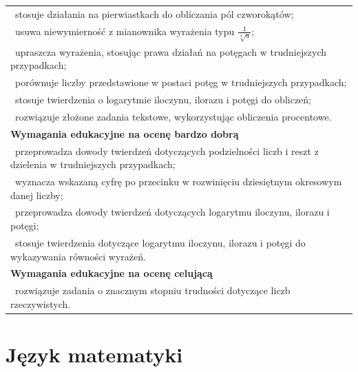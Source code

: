 \documentclass[12pt,a4paper]{article}
\begin{document}
\begin{longtable}{|p{16cm}|}
		\textbullet\ stosuje działania na pierwiastkach do obliczania pól czworokątów; \\
		
		\textbullet\ usuwa niewymierność z mianownika wyrażenia typu $\frac{1}{\sqrt[3]{a}}$; \\
		
		\textbullet\ upraszcza wyrażenia, stosując prawa działań na potęgach w trudniejszych przypadkach; \\
		
		\textbullet\ porównuje liczby przedstawione w postaci potęg w trudniejszych przypadkach; \\
		
		\textbullet\ stosuje twierdzenia o logarytmie iloczynu, ilorazu i potęgi do obliczeń; \\
		
		\textbullet\ rozwiązuje złożone zadania tekstowe, wykorzystując obliczenia procentowe. \\ \hline
		
		\textbf{Wymagania edukacyjne na ocenę bardzo dobrą} \\ \hline
		
		\textbullet\ przeprowadza dowody twierdzeń dotyczących podzielności liczb i reszt z dzielenia w trudniejszych przypadkach; \\
		
		\textbullet\ wyznacza wskazaną cyfrę po przecinku w rozwinięciu dziesiętnym okresowym danej liczby; \\
		
		\textbullet\ przeprowadza dowody twierdzeń dotyczących logarytmu iloczynu, ilorazu i potęgi; \\
		
		\textbullet\ stosuje twierdzenia dotyczące logarytmu iloczynu, ilorazu i potęgi do wykazywania równości wyrażeń. \\ \hline
		
		\textbf{Wymagania edukacyjne na ocenę celującą} \\ \hline
		
		\textbullet\ rozwiązuje zadania o znacznym stopniu trudności dotyczące liczb rzeczywistych. \\ \hline
		
	\end{longtable}
	
	\section{Język matematyki}
	
\end{document}

